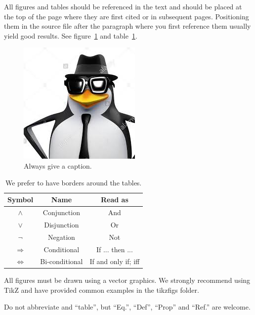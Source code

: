 All figures and tables should be referenced in the text and should be
placed at the top of the page where they are first cited or in
subsequent pages. Positioning them in the source file
after the paragraph where you first reference them usually yield good
results. See figure~\ref{fig:i} and table~\ref{mod1:tab:LogicSymbols}.
\begin{figure}[tbp]
   \centering %
   \includegraphics[width=.5\textwidth]{images.jpeg}
   \caption{\label{fig:i} Always give a caption.}
\end{figure}

\begin{table}[ht]
   \centering
   \begin{tabular}{|c|c|c|}
      \hline
         Symbol & Name & Read as\\
      \hline
      $\land$ & Conjunction & And \\
      $\lor$ & Disjunction & Or \\
      $\lnot$ & Negation & Not\\
      $\Rightarrow$ & Conditional & If ... then ...\\
      $\Leftrightarrow$ & Bi-conditional & If and only if; iff\\
      \hline
   \end{tabular}
    \caption{\label{mod1:tab:LogicSymbols} We prefer to have borders around the tables.}
\end{table}

All figures must be drawn using a vector graphics. We strongly recommend using
TikZ and have provided common examples in the tikzfigs folder.   

Do not abbreviate and ``table'', 
but ``Eq.'', ``Def'', ``Prop'' and ``Ref.'' are welcome.

